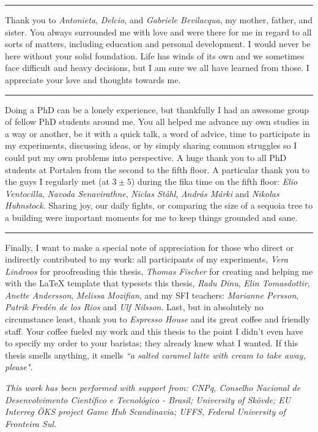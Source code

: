 \vspace{7pt}\hrule\vspace{5pt}

Thank you to \textit{Antonieta}, \textit{Delcio}, and \textit{Gabriele Bevilacqua}, my mother, father, and sister. You always surrounded me with love and were there for me in regard to all sorts of matters, including education and personal development. I would never be here without your solid foundation. Life has winds of its own and we sometimes face difficult and heavy decisions, but I am sure we all have learned from those. I appreciate your love and thoughts towards me.

\vspace{7pt}\hrule\vspace{5pt}

Doing a PhD can be a lonely experience, but thankfully I had an awesome group of fellow PhD students around me. You all helped me advance my own studies in a way or another, be it with a quick talk, a word of advice, time to participate in my experiments, discussing ideas, or by simply sharing common struggles so I could put my own problems into perspective. A huge thank you to all PhD students at Portalen from the second to the fifth floor. A particular thank you to the guys I regularly met (at $3\pm5$) during the fika time on the fifth floor: \textit{Elio Ventocilla}, \textit{Navoda Senavirathne}, \textit{Niclas St{\aa}hl}, \textit{Andr{\'a}s M{\'a}rki} and \textit{Nikolas Huhnstock}. Sharing joy, our daily fights, or comparing the size of a sequoia tree to a building were important moments for me to keep things grounded and sane.

\vspace{7pt}\hrule\vspace{5pt}

Finally, I want to make a special note of appreciation for those who direct or indirectly contributed to my work: all participants of my experiments, \textit{Vera Lindroos} for proofreading this thesis, \textit{Thomas Fischer} for creating and helping me with the {\LaTeX} template that typesets this thesis, \textit{Radu Dinu}, \textit{Elin Tomasdottir}, \textit{Anette Andersson}, \textit{Melissa Mozifian}, and my SFI teachers: \textit{Marianne Persson}, \textit{Patrik Fred{\'e}n de los Rios} and \textit{Ulf \-Nilsson}. Last, but in absolutely no circumstance least, thank you to \textit{Espresso House} and its great coffee and friendly staff. Your coffee fueled my work and this thesis to the point I didn't even have to specify my order to your baristas; they already knew what I wanted. If this thesis smells anything, it smells \textit{``a salted caramel latte with cream to take away, please"}.

\vspace*{\fill}

\textit{This work has been performed with support from: CNPq, Conselho Nacional de Desenvolvimento Cient\'{i}fico e Tecnol\'{o}gico - Brasil; University of Sk\"ovde; EU Interreg \"OKS project Game Hub Scandinavia; UFFS, Federal University of Fronteira Sul.}
